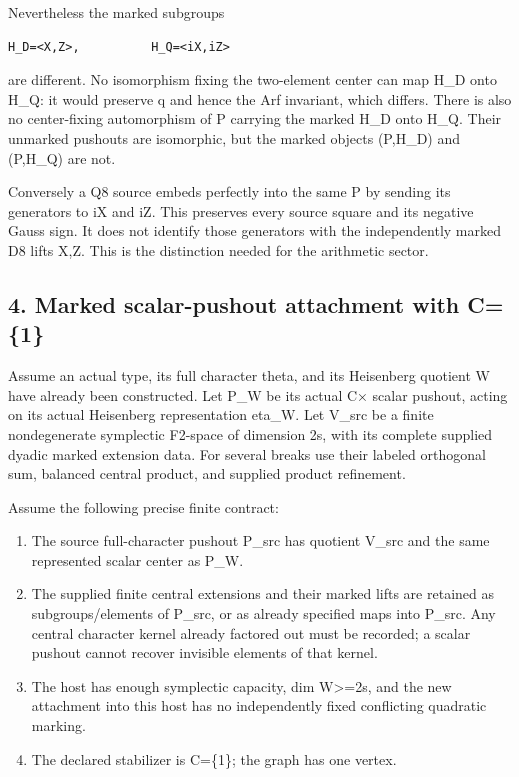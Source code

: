 Nevertheless the marked subgroups

\begin{Verbatim}[fontsize=\small,breaklines=true,breakanywhere=true]
H_D=<X,Z>,          H_Q=<iX,iZ>
\end{Verbatim}

are different. No isomorphism fixing the two-element center can map H\_D
onto H\_Q: it would preserve q and hence the Arf invariant, which
differs. There is also no center-fixing automorphism of P carrying the
marked H\_D onto H\_Q. Their unmarked pushouts are isomorphic, but the
marked objects (P,H\_D) and (P,H\_Q) are not.

Conversely a Q8 source embeds perfectly into the same P by sending its
generators to iX and iZ. This preserves every source square and its
negative Gauss sign. It does not identify those generators with the
independently marked D8 lifts X,Z. This is the distinction needed for
the arithmetic sector.

\hypertarget{dyadic_markings-marked-scalar-pushout-attachment-with-c1}{%
\subsection{4. Marked scalar-pushout attachment with
C=\{1\}}\label{dyadic_markings-marked-scalar-pushout-attachment-with-c1}}

Assume an actual type, its full character theta, and its Heisenberg
quotient W have already been constructed. Let P\_W be its actual C×
scalar pushout, acting on its actual Heisenberg representation eta\_W.
Let V\_src be a finite nondegenerate symplectic F2-space of dimension 2s,
with its complete supplied dyadic marked extension data. For several
breaks use their labeled orthogonal sum, balanced central product, and
supplied product refinement.

Assume the following precise finite contract:

\begin{enumerate}
\def\labelenumi{\arabic{enumi}.}
\tightlist
\item
  The source full-character pushout P\_src has quotient V\_src and the
  same represented scalar center as P\_W.
\item
  The supplied finite central extensions and their marked lifts are
  retained as subgroups/elements of P\_src, or as already specified maps
  into P\_src. Any central character kernel already factored out must be
  recorded; a scalar pushout cannot recover invisible elements of that
  kernel.
\item
  The host has enough symplectic capacity, dim W\textgreater=2s, and the
  new attachment into this host has no independently fixed conflicting
  quadratic marking.
\item
  The declared stabilizer is C=\{1\}; the graph has one vertex.
\end{enumerate}

